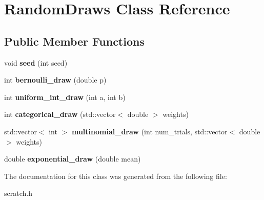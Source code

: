 \hypertarget{class_random_draws}{}\section{Random\+Draws Class Reference}
\label{class_random_draws}
\subsection*{Public Member Functions}
\begin{DoxyCompactItemize}
\item 
\mbox{\label{class_random_draws_ac51303a5f881fb5a63faf22ec5df45a6}} 
void {\bfseries seed} (int seed)
\item 
\mbox{\label{class_random_draws_ac8b563098308825fab6fbacc9a85635a}} 
int {\bfseries bernoulli\+\_\+draw} (double p)
\item 
\mbox{\label{class_random_draws_af255a22e2f1ba7c4c6c52efceb6541b7}} 
int {\bfseries uniform\+\_\+int\+\_\+draw} (int a, int b)
\item 
\mbox{\label{class_random_draws_a7ecc1e871163b2e32ab9259d6947dacd}} 
int {\bfseries categorical\+\_\+draw} (std\+::vector$<$ double $>$ weights)
\item 
\mbox{\label{class_random_draws_aa5561760124448e94147ba3ed609e95d}} 
std\+::vector$<$ int $>$ {\bfseries multinomial\+\_\+draw} (int num\+\_\+trials, std\+::vector$<$ double $>$ weights)
\item 
\mbox{\label{class_random_draws_a3c7d2ad8e19ad0c5b5f1dd004535b08c}} 
double {\bfseries exponential\+\_\+draw} (double mean)
\end{DoxyCompactItemize}


The documentation for this class was generated from the following file\+:\begin{DoxyCompactItemize}
\item 
scratch.\+h\end{DoxyCompactItemize}
